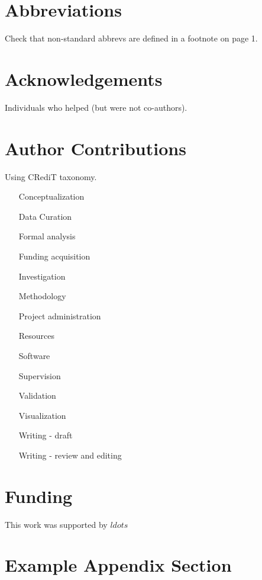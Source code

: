 \documentclass[preprint,12pt]{elsarticle}
\begin{document}
\section{Abbreviations}

Check that non-standard abbrevs are defined in a footnote on page 1.

\section{Acknowledgements}

Individuals who helped (but were not co-authors).

\section{Author Contributions}
Using CRediT taxonomy.

\begin{itemize}
\item[Conceptualization]{}
\item[Data Curation]{}
\item[Formal analysis ]{}
\item[Funding acquisition]{}
\item[Investigation]{}
\item[Methodology]{}
\item[Project administration]{}
\item[Resources]{}
\item[Software]{}
\item[Supervision]{}
\item[Validation]{}
\item[Visualization]{}
\item[Writing - draft]{}
\item[Writing - review and editing]{}
\end{itemize}

\section{Funding}

This work was supported by $ldots$

\appendix
\section{Example Appendix Section}
\label{app1}
\end{document}
